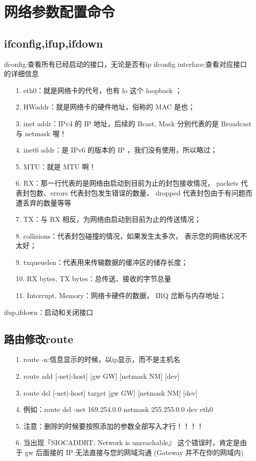 \documentclass[a4paper,left=1.5cm,right=1.5cm,11pt]{article}
\begin{document}
\tableofcontents

\clearpage

\section{网络参数配置命令}
\subsection{ifconfig,ifup,ifdown}
ifconfig:查看所有已经启动的接口，无论是否有ip
ifconfig interface:查看对应接口的详细信息
\begin{itemize}信息描述：
    \item[1.]eth0：就是网络卡的代号，也有 lo 这个 loopback ；
    \item[2.]HWaddr：就是网络卡的硬件地址，俗称的 MAC 是也；
    \item[3.]inet addr：IPv4 的 IP 地址，后续的 Bcast, Mask 分别代表的是 Broadcast 与 netmask 喔！
    \item[4.]inet6 addr：是 IPv6 的版本的 IP ，我们没有使用，所以略过；
    \item[5.]MTU：就是 MTU 啊！
    \item[6.]RX：那一行代表的是网络由启动到目前为止的封包接收情况， packets 代表封包数、errors 代表封包发生错误的数量、 dropped 代表封包由于有问题而遭丢弃的数量等等
    \item[7.]TX：与 RX 相反，为网络由启动到目前为止的传送情况；
    \item[8.]collisions：代表封包碰撞的情况，如果发生太多次， 表示您的网络状况不太好；
    \item[9.]txqueuelen：代表用来传输数据的缓冲区的储存长度；
    \item[10.]RX bytes, TX bytes：总传送、接收的字节总量
    \item[11.]Interrupt, Memory：网络卡硬件的数据， IRQ 岔断与内存地址；
\end{itemize}
ifup,ifdown：启动和关闭接口
\subsection{路由修改route}
\begin{itemize}信息描述：
    \item[1.]route -n:信息显示的时候，以ip显示，而不是主机名
    \item[2.]route add [-net|-host]     [gw GW] [netmask NM] [dev]
    \item[3.]route del [-net|-host] target [gw GW] [netmask NM] [dev]
    \item[4.]例如：route del -net 169.254.0.0 netmask 255.255.0.0 dev eth0
    \item[5.]注意：删除的时候要按照添加的参数全部写入才行！！！！ 
    \item[6.]当出现『SIOCADDRT: Network is unreachable』 这个错误时，肯定是由于 gw 后面接的 IP 无法直接与您的网域沟通 (Gateway 并不在你的网域内)
\end{itemize}
\end{document}
